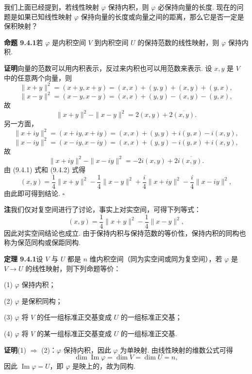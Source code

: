 \documentclass[UTF8,12pt,a4paper,fontset=fandol]{ctexart}
\begin{document}
我们上面已经提到，若线性映射 $\varphi$ 保持内积，则 $\varphi$ 必保持向量的长度. 现在的问题是如果已知线性映射 $\varphi$ 保持向量的长度或向量之间的距离，那么它是否一定是保积映射？

\noindent\textbf{命题 9.4.1}\quad 若 $\varphi$ 是内积空间 $V$ 到内积空间 $U$ 的保持范数的线性映射，则 $\varphi$ 保持内积.

\noindent\textbf{证明}\quad 向量的范数可以用内积表示，反过来内积也可以用范数来表示. 设 $x,y$ 是 $V$ 中的任意两个向量，则
\[
  \|x+y\|^2=(x+y,x+y)=(x,x)+(y,y)+(x,y)+(y,x),
\]
\[
  \|x-y\|^2=(x-y,x-y)=(x,x)+(y,y)-(x,y)-(y,x),
\]
故
\begin{equation}
  \|x+y\|^2-\|x-y\|^2=2(x,y)+2\overline{(x,y)}.
  \tag{9.4.1}
\end{equation}
另一方面，
\[
  \|x+iy\|^2=(x+iy,x+iy)=(x,x)+(y,y)+i(y,x)-i(x,y),
\]
\[
  \|x-iy\|^2=(x-iy,x-iy)=(x,x)+(y,y)-i(y,x)+i(x,y),
\]
故
\begin{equation}
  \|x+iy\|^2-\|x-iy\|^2=-2i(x,y)+2i\overline{(x,y)}.
  \tag{9.4.2}
\end{equation}
由 (9.4.1) 式和 (9.4.2) 式得
\begin{equation}
  (x,y)=\frac14\|x+y\|^2-\frac14\|x-y\|^2
  +\frac i4\|x+iy\|^2-\frac i4\|x-iy\|^2,
  \tag{9.4.3}
\end{equation}
由此即可得到结论. $\square$

\noindent\textbf{注}\quad 我们仅对复空间进行了讨论，事实上对实空间，可得下列等式：
\begin{equation}
  (x,y)=\frac14\|x+y\|^2-\frac14\|x-y\|^2,
  \tag{9.4.4}
\end{equation}
因此对实空间结论也成立. 由于保持内积与保持范数的等价性，保持内积的同构也称为保范同构或保距同构.

\noindent\textbf{定理 9.4.1}\quad 设 $V$ 与 $U$ 都是 $n$ 维内积空间（同为实空间或同为复空间），若 $\varphi$ 是 $V\to U$ 的线性映射，则下列命题等价：

(1) $\varphi$ 保持内积；

(2) $\varphi$ 是保积同构；

(3) $\varphi$ 将 $V$ 的任一组标准正交基变成 $U$ 的一组标准正交基；

(4) $\varphi$ 将 $V$ 的某一组标准正交基变成 $U$ 的一组标准正交基.

\noindent\textbf{证明}\quad (1) $\Rightarrow$ (2)：$\varphi$ 保持内积，因此 $\varphi$ 为单映射. 由线性映射的维数公式可得
\[
  \dim\operatorname{Im}\varphi=\dim V=\dim U=n,
\]
因此 $\operatorname{Im}\varphi=U$，即 $\varphi$ 是映上的，故为同构.
\end{document}
